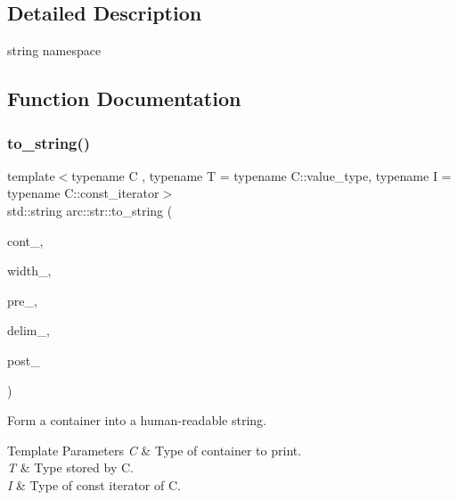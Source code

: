 \subsection{Detailed Description}
string namespace 

\subsection{Function Documentation}
\mbox{\label{namespacearc_1_1str_a53e4e5a084da03d5cc8ea2d4ee8ba7d0}} 
\subsubsection{\texorpdfstring{to\+\_\+string()}{to\_string()}\hspace{0.1cm}{\footnotesize\ttfamily [1/3]}}
{\footnotesize\ttfamily template$<$typename C , typename T  = typename C\+::value\+\_\+type, typename I  = typename C\+::const\+\_\+iterator$>$ \\
std\+::string arc\+::str\+::to\+\_\+string (\begin{DoxyParamCaption}\item[{const C \&}]{cont\+\_\+,  }\item[{const size\+\_\+t}]{width\+\_\+,  }\item[{const std\+::string \&}]{pre\+\_\+,  }\item[{const std\+::string \&}]{delim\+\_\+,  }\item[{const std\+::string \&}]{post\+\_\+ }\end{DoxyParamCaption})\hspace{0.3cm}{\ttfamily [inline]}}

Form a container into a human-\/readable string.


\begin{DoxyTemplParams}{Template Parameters}
{\em C} & Type of container to print. \\
\hline
{\em T} & Type stored by C. \\
\hline
{\em I} & Type of const iterator of C.\\
\hline
\end{DoxyTemplParams}

